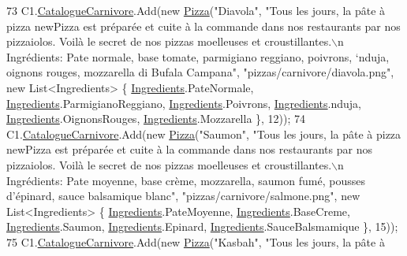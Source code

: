 \begin{DoxyCode}
73             C1.\hyperlink{classModele_1_1Catalogue_a4af9ef768f67cef6dfe545e22a6d63af}{CatalogueCarnivore}.Add(\textcolor{keyword}{new} \hyperlink{classModele_1_1Pizza}{Pizza}(\textcolor{stringliteral}{"Diavola"}, \textcolor{stringliteral}{"Tous les jours, la pâte
       à pizza newPizza est préparée et cuite à la commande dans nos restaurants par nos pizzaiolos. Voilà le
       secret de nos pizzas moelleuses et croustillantes.\(\backslash\)n Ingrédients: Pate normale, base tomate, parmigiano reggiano,
       poivrons, ‘nduja, oignons rouges, mozzarella di Bufala Campana"}, \textcolor{stringliteral}{"pizzas/carnivore/diavola.png"}, \textcolor{keyword}{new} 
      List<Ingredients> \{ \hyperlink{namespaceModele_a001a8e89e56a724f24a249ba98080d41}{Ingredients}.PateNormale, \hyperlink{namespaceModele_a001a8e89e56a724f24a249ba98080d41}{Ingredients}.ParmigianoReggiano, 
      \hyperlink{namespaceModele_a001a8e89e56a724f24a249ba98080d41}{Ingredients}.Poivrons, \hyperlink{namespaceModele_a001a8e89e56a724f24a249ba98080d41}{Ingredients}.nduja, \hyperlink{namespaceModele_a001a8e89e56a724f24a249ba98080d41}{Ingredients}.OignonsRouges, 
      \hyperlink{namespaceModele_a001a8e89e56a724f24a249ba98080d41}{Ingredients}.Mozzarella \}, 12));
74             C1.\hyperlink{classModele_1_1Catalogue_a4af9ef768f67cef6dfe545e22a6d63af}{CatalogueCarnivore}.Add(\textcolor{keyword}{new} \hyperlink{classModele_1_1Pizza}{Pizza}(\textcolor{stringliteral}{"Saumon"}, \textcolor{stringliteral}{"Tous les jours, la pâte à
       pizza newPizza est préparée et cuite à la commande dans nos restaurants par nos pizzaiolos. Voilà le secret
       de nos pizzas moelleuses et croustillantes.\(\backslash\)n Ingrédients: Pate moyenne, base crème, mozzarella, saumon
       fumé, pousses d’épinard, sauce balsamique blanc"}, \textcolor{stringliteral}{"pizzas/carnivore/salmone.png"}, \textcolor{keyword}{new} List<Ingredients> \{ 
      \hyperlink{namespaceModele_a001a8e89e56a724f24a249ba98080d41}{Ingredients}.PateMoyenne, \hyperlink{namespaceModele_a001a8e89e56a724f24a249ba98080d41}{Ingredients}.BaseCreme, 
      \hyperlink{namespaceModele_a001a8e89e56a724f24a249ba98080d41}{Ingredients}.Saumon, \hyperlink{namespaceModele_a001a8e89e56a724f24a249ba98080d41}{Ingredients}.Epinard, \hyperlink{namespaceModele_a001a8e89e56a724f24a249ba98080d41}{Ingredients}.SauceBalsmamique \}, 
      15));
75             C1.\hyperlink{classModele_1_1Catalogue_a4af9ef768f67cef6dfe545e22a6d63af}{CatalogueCarnivore}.Add(\textcolor{keyword}{new} \hyperlink{classModele_1_1Pizza}{Pizza}(\textcolor{stringliteral}{"Kasbah"}, \textcolor{stringliteral}{"Tous les jours, la pâte à
}
\end{DoxyCode}

